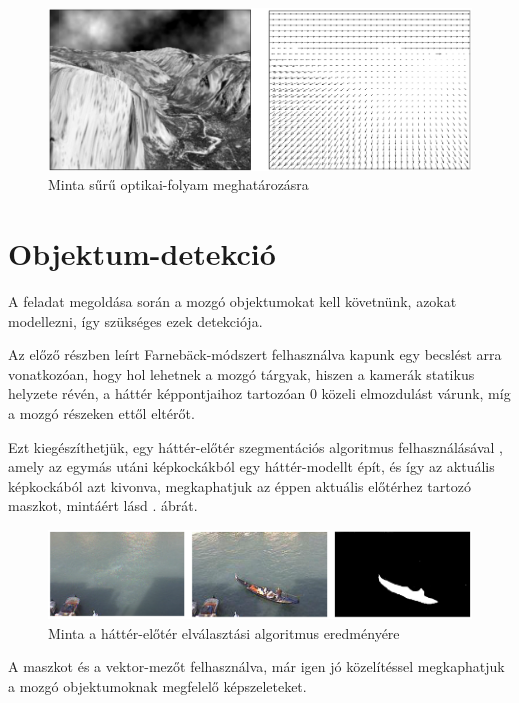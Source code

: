 \begin{figure}[tbh]
\centering
\includegraphics[width=420pt]{figures/farneback.png}
\caption{Minta sűrű optikai-folyam meghatározásra \cite{farneback} \label{fig:dense-of}}
\end{figure}

\section{Objektum-detekció}

A feladat megoldása során a mozgó objektumokat kell követnünk, azokat modellezni, így szükséges ezek detekciója.

Az előző részben leírt Farnebäck-módszert felhasználva kapunk egy becslést arra vonatkozóan, hogy hol lehetnek a mozgó tárgyak, hiszen a kamerák statikus helyzete révén, a háttér képpontjaihoz tartozóan 0 közeli elmozdulást várunk, míg a mozgó részeken ettől eltérőt.

Ezt kiegészíthetjük, egy háttér-előtér szegmentációs algoritmus felhasználásával \cite{MOG}, amely az egymás utáni képkockákból egy háttér-modellt épít, és így az aktuális képkockából azt kivonva, megkaphatjuk az éppen aktuális előtérhez tartozó maszkot, mintáért lásd . ábrát.

\begin{figure}[tbh]
\centering
\includegraphics{figures/mog.png}
\caption{Minta a háttér-előtér elválasztási algoritmus eredményére \cite{mog-example} \label{fig:mog-example}}
\end{figure}

A maszkot és a vektor-mezőt felhasználva, már igen jó közelítéssel megkaphatjuk a mozgó objektumoknak megfelelő képszeleteket.
